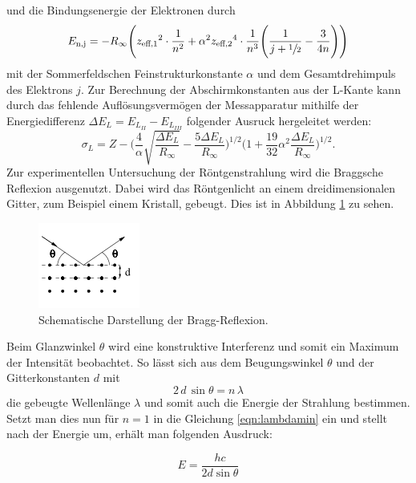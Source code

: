 und die Bindungsenergie der Elektronen durch
\begin{equation}
  E_\text{n,j} = - R_{\infty} \Biggl({z_\text{eff,1}}^2 \cdot \frac{1}{n^2} + {\alpha}^2 {z_\text{eff,2}}^4 \cdot \frac{1}{n^3} \Biggl(\frac{1}{j+\sfrac{1}{2}} - \frac{3}{4n} \Biggr) \Biggr)
  \label{eqn:feinstruktur}
\end{equation}
mit der Sommerfeldschen Feinstrukturkonstante $\alpha$ und dem Gesamtdrehimpuls des Elektrons $j$.
Zur Berechnung der Abschirmkonstanten aus der L-Kante kann durch das fehlende Auflösungsvermögen der Messapparatur mithilfe der Energiedifferenz $\Delta E_L = E_{L_{II}}- E_{L_{III}}$ folgender
Ausruck hergeleitet werden:
\begin{equation}
{\sigma}_L = Z - \Biggl(\frac{4}{\alpha} \sqrt{\frac{\Delta E_L}{R_{\infty}}} - \frac{5 \Delta E_L}{R_{\infty}} \Biggr)^{1/2} \Biggl(1+ \frac{19}{32} {\alpha}^2 \frac{\Delta E_L}{R_{\infty}} \Biggr)^{1/2} .
\label{eqn:sigmaL}
\end{equation}
Zur experimentellen Untersuchung der Röntgenstrahlung wird die Braggsche Reflexion ausgenutzt. Dabei wird das Röntgenlicht an einem dreidimensionalen Gitter, zum Beispiel einem Kristall, gebeugt.
Dies ist in Abbildung \ref{fig:braggreflexion} zu sehen.
\begin{figure}
  \centering
  \includegraphics{images/bragg.png}
  \caption{Schematische Darstellung der Bragg-Reflexion.\cite{sample}}
  \label{fig:braggreflexion}
\end{figure}
Beim Glanzwinkel $\theta$ wird eine konstruktive Interferenz und somit ein Maximum der Intensität beobachtet. So lässt sich aus dem Beugungswinkel $\theta$ und der Gitterkonstanten $d$ mit
\begin{equation}
  2 \, d \, \sin{\theta} = n \, \lambda
  \label{eqn:bragg}
\end{equation}
die gebeugte Wellenlänge $\lambda$ und somit auch die Energie der Strahlung bestimmen.
Setzt man dies nun für $n = 1$ in die Gleichung \eqref{eqn:lambdamin} ein und stellt nach der Energie um, erhält man folgenden Ausdruck:

\begin{equation}
  E = \frac{h c}{2 d \sin{\theta}}
  \label{eqn:Energie}
\end{equation}
